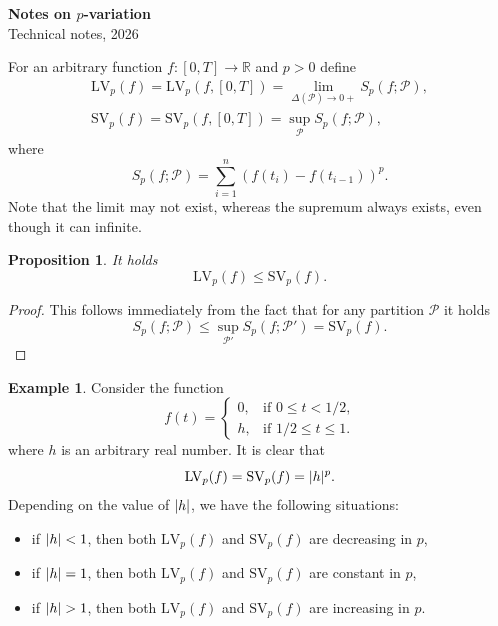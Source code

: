 \documentclass[a4paper,oneside,12pt]{extreport}
\theoremstyle{plain}
\newtheorem{proposition}[theorem]{Proposition}
\theoremstyle{definition}
\newtheorem{example}[theorem]{Example}
\theoremstyle{remark}
\newcommand*{\mbR}{\mathbb{R}}
\newcommand*{\mcP}{\mathcal{P}}
\newcommand*{\les}{\leqslant}
\newcommand*{\LV}{\text{LV}}
\newcommand*{\SV}{\text{SV}}
\DeclarePairedDelimiter{\abs}{\lvert}{\rvert}
\begin{document}
\begin{center}
{\large\bfseries Notes on $p$-variation}\\[6pt]
{\small Technical notes, 2026}
\end{center}
\bigskip


For an arbitrary function $f\colon [0,T]\to\mbR$ and $p>0$ define
\begin{gather*}
\LV_p(f)=\text{LV}_p(f,[0,T])=\lim_{\Delta(\mcP)\to 0+} S_p(f;\mcP),\\
\SV_p(f)=\text{SV}_p(f,[0,T])=\sup_{\mcP} S_p(f;\mcP),
\end{gather*}
where
\[
S_p(f;\mcP)=\sum_{i=1}^n (f(t_i)-f(t_{i-1}))^p.
\]
Note that the limit may not exist, whereas the supremum always exists, even though it can infinite.


\begin{proposition}
It holds
\[
\LV_p(f)\les\SV_p(f).
\]
\end{proposition}


\begin{proof}
This follows immediately from the fact that for any partition $\mcP$ it holds
\[
S_p(f;\mcP)\les\sup_{\mcP'} S_p(f;\mcP')=\SV_p(f).
\]
\end{proof}


\begin{example}
Consider the function
\[
f(t)=
\begin{cases}
0,&\text{if $0\les t<1/2$,}\\
h,&\text{if $1/2\les t\les 1$.}
\end{cases}
\]
where $h$ is an arbitrary real number. It is clear that
\[
\LV_p(f)=\SV_p(f)=\abs{h}^p.
\]
Depending on the value of $\abs{h}$, we have the following situations:
\begin{itemize}
\item
if $\abs{h}<1$, then both $\LV_p(f)$ and $\SV_p(f)$ are decreasing in $p$,

\item
if $\abs{h}=1$, then both $\LV_p(f)$ and $\SV_p(f)$ are constant in $p$,

\item
if $\abs{h}>1$, then both $\LV_p(f)$ and $\SV_p(f)$ are increasing in $p$.
\end{itemize}
\end{example}
\end{document}
